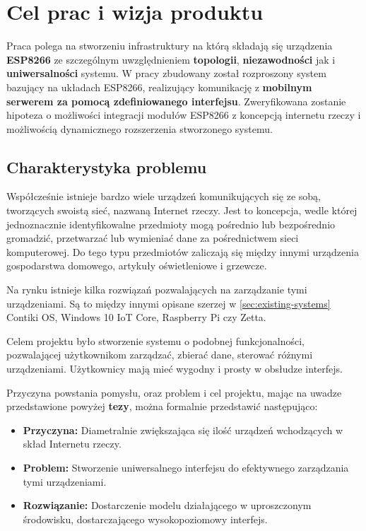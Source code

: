 \section{Cel prac i wizja produktu}
\label{sec:cel-wizja}
Praca polega na stworzeniu infrastruktury na którą składają się urządzenia \textbf{ESP8266} ze szczególnym uwzględnieniem \textbf{topologii}, \textbf{niezawodności} jak i \textbf{uniwersalności} systemu. W pracy zbudowany został rozproszony system bazujący na układach ESP8266, realizujący komunikację z \textbf{mobilnym serwerem za pomocą zdefiniowanego interfejsu}. Zweryfikowana zostanie hipoteza o możliwości integracji modułów ESP8266 z koncepcją internetu rzeczy i możliwością dynamicznego rozszerzenia stworzonego systemu.

\subsection{Charakterystyka problemu}

Współcześnie istnieje bardzo wiele urządzeń komunikujących się ze sobą, tworzących swoistą sieć, nazwaną Internet rzeczy\cite{iot-art}. Jest to koncepcja, wedle której jednoznacznie identyfikowalne przedmioty mogą pośrednio lub bezpośrednio gromadzić, przetwarzać lub wymieniać dane za pośrednictwem sieci komputerowej. Do tego typu przedmiotów zaliczają się między innymi urządzenia gospodarstwa domowego, artykuły oświetleniowe i grzewcze\cite{iot-www}.

Na rynku istnieje kilka rozwiązań pozwalających na zarządzanie tymi urządzeniami. Są to między innymi opisane szerzej w \autoref{sec:existing-systems} Contiki OS, Windows 10 IoT Core, Raspberry Pi czy Zetta.

Celem projektu było stworzenie systemu o podobnej funkcjonalności, pozwalającej użytkownikom zarządzać, zbierać dane, sterować różnymi urządzeniami. Użytkownicy mają mieć wygodny i prosty w obsłudze interfejs. 

Przyczyna powstania pomysłu, oraz problem i cel projektu, mając na uwadze przedstawione powyżej \textbf{tezy}, można formalnie przedstawić następująco:

\begin{itemize}
	\item \textbf{Przyczyna:} Diametralnie zwiększająca się ilość urządzeń wchodzących w skład Internetu rzeczy\cite{iot-art}.
	\item \textbf{Problem:} Stworzenie uniwersalnego interfejsu do efektywnego zarządzania tymi urządzeniami.
	\item \textbf{Rozwiązanie:} Dostarczenie modelu działającego w uproszczonym środowisku, dostarczającego wysokopoziomowy interfejs.
\end{itemize}

